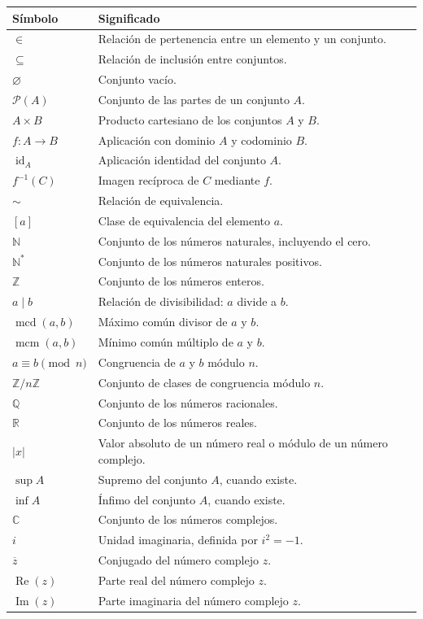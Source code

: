 \documentclass[11pt,a4paper,openany]{book}
\newcommand{\N}{\mathbb{N}}
\newcommand{\Z}{\mathbb{Z}}
\newcommand{\Q}{\mathbb{Q}}
\newcommand{\R}{\mathbb{R}}
\newcommand{\C}{\mathbb{C}}
\newcommand{\Pow}{\mathcal{P}}
\newcommand{\id}{\operatorname{id}}
\newcommand{\mcd}{\operatorname{mcd}}
\newcommand{\mcm}{\operatorname{mcm}}
\begin{document}
\begin{longtable}{>{\bfseries}p{}p{}}
\toprule
Símbolo & Significado \\
\midrule
\endhead
\(\in\) & Relación de pertenencia entre un elemento y un conjunto. \\
\(\subseteq\) & Relación de inclusión entre conjuntos. \\
\(\varnothing\) & Conjunto vacío. \\
\(\Pow(A)\) & Conjunto de las partes de un conjunto \(A\). \\
\(A\times B\) & Producto cartesiano de los conjuntos \(A\) y \(B\). \\
\(f:A\to B\) & Aplicación con dominio \(A\) y codominio \(B\). \\
\(\id_A\) & Aplicación identidad del conjunto \(A\). \\
\(f^{-1}(C)\) & Imagen recíproca de \(C\) mediante \(f\). \\
\(\sim\) & Relación de equivalencia. \\
\([a]\) & Clase de equivalencia del elemento \(a\). \\
\(\N\) & Conjunto de los números naturales, incluyendo el cero. \\
\(\N^{\ast}\) & Conjunto de los números naturales positivos. \\
\(\Z\) & Conjunto de los números enteros. \\
\(a\mid b\) & Relación de divisibilidad: \(a\) divide a \(b\). \\
\(\mcd(a,b)\) & Máximo común divisor de \(a\) y \(b\). \\
\(\mcm(a,b)\) & Mínimo común múltiplo de \(a\) y \(b\). \\
\(a\equiv b\pmod n\) & Congruencia de \(a\) y \(b\) módulo \(n\). \\
\(\Z/n\Z\) & Conjunto de clases de congruencia módulo \(n\). \\
\(\Q\) & Conjunto de los números racionales. \\
\(\R\) & Conjunto de los números reales. \\
\(|x|\) & Valor absoluto de un número real o módulo de un número complejo. \\
\(\sup A\) & Supremo del conjunto \(A\), cuando existe. \\
\(\inf A\) & Ínfimo del conjunto \(A\), cuando existe. \\
\(\C\) & Conjunto de los números complejos. \\
\(i\) & Unidad imaginaria, definida por \(i^2=-1\). \\
\(\overline{z}\) & Conjugado del número complejo \(z\). \\
\(\operatorname{Re}(z)\) & Parte real del número complejo \(z\). \\
\(\operatorname{Im}(z)\) & Parte imaginaria del número complejo \(z\). \\
\bottomrule
\end{longtable}
\end{document}
